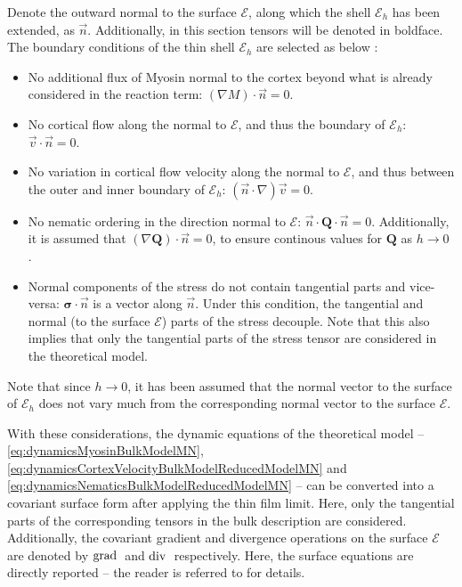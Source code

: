 Denote the outward normal to the surface $\mathcal{E}$, along which the shell $\mathcal{E}_h$ has been extended, as $\vec{n}$. Additionally, in this section tensors will be denoted in boldface. The boundary conditions of the thin shell $\mathcal{E}_h$ are selected as below \citep{nestler2020properties,arroyo2009relaxation,nitschke2020liquid}:
\begin{itemize}
    \item No additional flux of Myosin normal to the cortex beyond what is already considered in the reaction term: $(\nabla M)\cdot\vec{n} = 0$.
    \item No cortical flow along the normal to $\mathcal{E}$, and thus the boundary of $\mathcal{E}_h$: $\vec{v}\cdot\vec{n} = 0$.
    \item No variation in cortical flow velocity along the normal to $\mathcal{E}$, and thus between the outer and inner boundary of $\mathcal{E}_h$: $(\vec{n}\cdot\nabla)\vec{v} = 0$.
    \item No nematic ordering in the direction normal to $\mathcal{E}$: $\vec{n}\cdot\mathbf{Q}\cdot\vec{n} = 0$. Additionally, it is assumed that $(\nabla\mathbf{Q})\cdot\vec{n} = 0$, to ensure continous values for $\mathbf{Q}$ as $h \rightarrow 0$ \citep{nestler2020properties}.
    \item Normal components of the stress do not contain tangential parts and vice-versa: $\mathbf{\sigma}\cdot\vec{n}$ is a vector along $\vec{n}$. Under this condition, the tangential and normal (to the surface $\mathcal{E}$) parts of the stress decouple. Note that this also implies that only the tangential parts of the stress tensor are considered in the theoretical model.
\end{itemize}
Note that since $h \rightarrow 0$, it has been assumed that the normal vector to the surface of $\mathcal{E}_h$ does not vary much from the corresponding normal vector to the surface $\mathcal{E}$.

With these considerations, the dynamic equations of the theoretical model -- \autoref{eq:dynamicsMyosinBulkModelMN}, \autoref{eq:dynamicsCortexVelocityBulkModelReducedModelMN} and \autoref{eq:dynamicsNematicsBulkModelReducedModelMN} -- can be converted into a covariant surface form after applying the thin film limit. Here, only the tangential parts of the corresponding tensors in the bulk description are considered. Additionally, the covariant gradient and divergence operations on the surface $\mathcal{E}$ are denoted by $\mathrm{grad}\:$ and $\mathrm{div}\:$ respectively. Here, the surface equations are directly reported -- the reader is referred to \citep{} for details.

